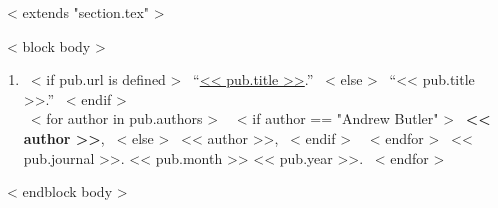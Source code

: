 ~< extends "section.tex" >~

~< block body >~
  \begin{enumerate}
    \itemsep 1em
    ~< for pub in items >~
      \item{
        ~< if pub.url is defined >~
          ``\href{<< pub.url >>}{<< pub.title >>}.''
        ~< else >~
          ``<< pub.title >>.''
        ~< endif >~\\
	~< for author in pub.authors >~
		~< if author == "Andrew Butler" >~
			\textbf{ << author >>},
		~< else >~
        		<< author >>,
		~< endif >~
	~< endfor >~
        << pub.journal >>.
        << pub.month >>
        << pub.year >>.
      }
    ~< endfor >~
  \end{enumerate}
~< endblock body >~
